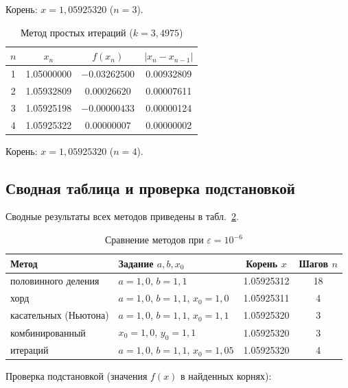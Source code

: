\documentclass[14pt,a4paper]{extarticle}
\begin{document}
Корень: $x = 1{,}05925320$ ($n=3$).

\begin{table}[H]
    \centering
    \caption{Метод простых итераций ($k=3{,}4975$)}
    \label{tab:iteration}
    \begin{tabular}{cccc}
        \toprule
        $n$ & $x_n$ & $f(x_n)$ & $|x_n-x_{n-1}|$\\
        \midrule
        1 & 1.05000000 & $-0.03262500$ & 0.00932809\\
        2 & 1.05932809 & $0.00026620$ & 0.00007611\\
        3 & 1.05925198 & $-0.00000433$ & 0.00000124\\
        4 & 1.05925322 & $0.00000007$ & 0.00000002\\
        \bottomrule
    \end{tabular}
\end{table}

Корень: $x = 1{,}05925320$ ($n=4$).

\subsection{Сводная таблица и проверка подстановкой}

Сводные результаты всех методов приведены в табл.~\ref{tab:summary}.

\begin{table}[H]
    \centering
    \caption{Сравнение методов при $\varepsilon = 10^{-6}$}
    \label{tab:summary}
    \small
    \begin{tabular}{@{}p{4.4cm}p{4.6cm}cc@{}}
        \toprule
        Метод & Задание $a,b,x_0$ & Корень $x$ & Шагов $n$\\
        \midrule
        половинного деления & $a=1{,}0$, $b=1{,}1$ & 1.05925312 & 18\\
        хорд & $a=1{,}0$, $b=1{,}1$, $x_0=1{,}0$ & 1.05925311 & 4\\
        касательных (Ньютона) & $a=1{,}0$, $b=1{,}1$, $x_0=1{,}1$ & 1.05925320 & 3\\
        комбинированный & $x_0=1{,}0$, $y_0=1{,}1$ & 1.05925320 & 3\\
        итераций & $a=1{,}0$, $b=1{,}1$, $x_0=1{,}05$ & 1.05925320 & 4\\
        \bottomrule
    \end{tabular}
\end{table}

Проверка подстановкой (значения $f(x)$ в найденных корнях):
\end{document}
